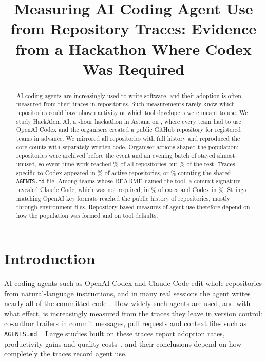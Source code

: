 \documentclass{article}
\title{Measuring AI Coding Agent Use from Repository Traces: Evidence from a Hackathon Where Codex Was Required}
\date{\versiondate}
\author{\authorblock}
\begin{document}
\maketitle

\begin{abstract}
AI coding agents are increasingly used to write software, and their adoption is often measured from their traces in repositories. Such measurements rarely know which repositories could have shown activity or which tool developers were meant to use. We study HackAlem AI, a \eventhours-hour hackathon in Astana on \eventdate, where every team had to use OpenAI Codex and the organisers created a public GitHub repository for registered teams in advance. We mirrored all \NRqOneTotal{} repositories with full history and reproduced the core counts with separately written code. Organiser actions shaped the population: \NRqOnePrearchivedN{} repositories were archived before the event and an evening batch of \NRqOneBatchN{} stayed almost unused, so event-time work reached \NRqOneActivePct\% of all repositories but \NRqOneActiveOfOpenNonbatchPct\% of the rest. Traces specific to Codex appeared in \NRqTwoTracesCodexSpecificPct\% of active repositories, or \NRqTwoTracesCodexAnyPct\% counting the shared \texttt{AGENTS.md} file. Among teams whose README named the tool, a commit signature revealed Claude Code, which was not required, in \NRqTwoTracesSelfReportClaudeStrictSignatureGivenMentionPct\% of cases and Codex in \NRqTwoTracesSelfReportCodexStrictSignatureGivenMentionPct\%. Strings matching OpenAI key formats reached the public history of \NRqFourOpenaiN{} repositories, mostly through environment files. Repository-based measures of agent use therefore depend on how the population was formed and on tool defaults.
\end{abstract}

\section{Introduction}\label{sec:intro}

AI coding agents such as OpenAI Codex and Claude Code edit whole repositories from natural-language instructions, and in many real sessions the agent writes nearly all of the committed code~\cite{baumann2026swechat}. How widely such agents are used, and with what effect, is increasingly measured from the traces they leave in version control: co-author trailers in commit messages, pull requests and context files such as \texttt{AGENTS.md}~\cite{li2025aidev,robbes2026agenticmuch,robbes2026heuristics,chatlatanagulchai2025agentreadmes}. Large studies built on these traces report adoption rates, productivity gains and quality costs~\cite{robbes2026agenticmuch,agarwal2026aiides,he2026cursor}, and their conclusions depend on how completely the traces record agent use.
\end{document}
